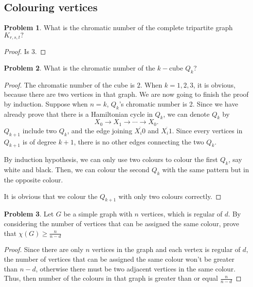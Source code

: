 \documentclass[a4paper,11pt]{article}%
\theoremstyle{remark}
\theoremstyle{definition}
\newtheorem{problem}{Problem}[subsection]
\begin{document}
\subsection{Colouring vertices}
\begin{problem}
    What is the chromatic number of the complete tripartite graph $K_{r,s,t}?$
    \begin{proof}
        Is 3.
    \end{proof}
\end{problem}
\begin{problem}
    What is the chromatic number of the $k-$cube $Q_k$?
    \begin{proof}
        The chromatic number of the cube is $2$.
        When $k=1,2,3$, it is obvious, because there are two vertices in that graph.
        We are now going to finish the proof by induction.
        Suppose when $n=k$, $Q_k$'s chromatic number is 2.
        Since we have already prove that there is a Hamiltonian cycle in $Q_k$, 
        we can denote $Q_k$ by 
        \[X_0\rightarrow X_1\rightarrow\cdots\rightarrow X_0.\]
        $Q_{k+1}$ include two $Q_k$, 
        and the edge joining $\overline{X_i0}$ and $\overline{X_i1}$.
        Since every vertices in $Q_{k+1}$ is of degree $k+1$, there is no other 
        edges connecting the two $Q_k$.

        By induction hypothesis, we can only use two colours to colour the first $Q_{k}$, say white and black.
        Then, we can colour the second $Q_k$ with the same pattern but in the opposite colour.

        It is obvious that we colour the $Q_{k+1}$ with only two colours correctly.
    \end{proof}
\end{problem}
\begin{problem}
    Let $G$ be a simple graph with $n$ vertices, which is regular of $d$. By considering the number of vertices that can be 
    assigned the same colour, prove that $\chi(G)\geq \frac{n}{n-d}$
\end{problem}
\begin{proof}
   Since there are only $n$ vertices in the graph and each vertex is regular of $d$, the number of vertices that can be assigned the same 
   colour won't be greater than $n-d$, otherwise there must be two adjacent vertices in the same colour.
   Thus, then number of the colours in that graph is greater than or equal $\frac{n}{n-d}$
\end{proof}
\end{document}

